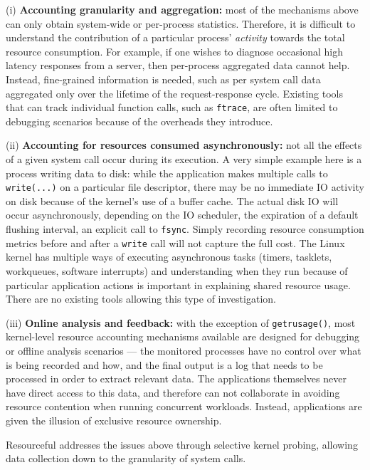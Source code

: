 \documentclass[letterpaper,twocolumn,10pt]{article}
\newcommand{\pname}{Resourceful}
\begin{document}
(i) \textbf{Accounting granularity and aggregation:} most of the mechanisms
above can only obtain system-wide or per-process statistics. Therefore, it is
difficult to understand the contribution of a particular process'
\textit{activity} towards the total resource consumption. For example, if one
wishes to diagnose occasional high latency responses from a server, then
per-process aggregated data cannot help. Instead, fine-grained information is
needed, such as per system call data aggregated only over the lifetime of the
request-response cycle. Existing tools that can track individual function calls,
such as \texttt{ftrace}, are often limited to debugging scenarios because of the overheads
they introduce.

(ii) \textbf{Accounting for resources consumed asynchronously:} not all the
effects of a given system call occur during its execution. A very simple example here
is a process writing data to disk: while the application makes multiple calls to
\texttt{write(...)} on a particular file descriptor, there may be no immediate
IO activity on disk because of the kernel's use of a buffer cache. The actual disk IO
will occur asynchronously, depending on the IO scheduler, the expiration of a
default flushing interval, an explicit call to \texttt{fsync}. Simply
recording resource consumption metrics before and after a \texttt{write}
call will not capture the full cost. The Linux kernel has multiple ways of
executing asynchronous tasks (timers, tasklets, workqueues, software
interrupts) and understanding when they run because of particular application
actions is important in explaining shared resource usage. There are no existing
tools allowing this type of investigation.

(iii) \textbf{Online analysis and feedback:} with the exception of
\texttt{getrusage()}, most kernel-level resource accounting mechanisms available
are designed for debugging or offline analysis scenarios --- the monitored
processes have no control over what is being recorded and how, and the final
output is a log that needs to be processed in order to extract relevant data.
The applications themselves never have direct access to this data, and therefore
can not collaborate in avoiding resource contention when running concurrent
workloads. Instead, applications are given the illusion of exclusive
resource ownership.

\pname{ }addresses the issues above through selective kernel probing, allowing
data collection down to the granularity of system calls.
\end{document}
